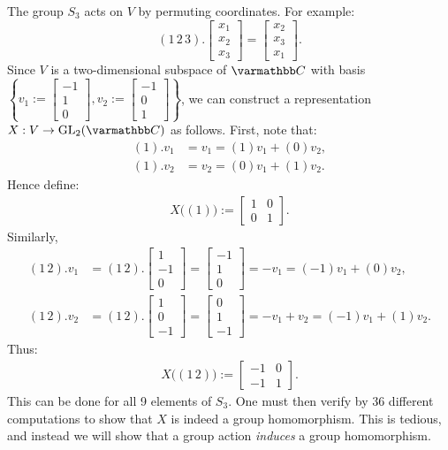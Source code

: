\begin{example}
	The group $S_3$ acts on $V$ by permuting coordinates. For example:
	\[
		(1\,2\,3).\begin{bmatrix} x_1 \\ x_2 \\ x_3 \end{bmatrix} = \begin{bmatrix} x_2 \\ x_3 \\x_1 \end{bmatrix}.
	\]
	Since $V$ is a two-dimensional subspace of $\bfC$ with basis $\left\{ v_1:= \begin{bmatrix} -1 \\ 1 \\ 0 \end{bmatrix}, v_2:= \begin{bmatrix} -1 \\ 0 \\ 1 \end{bmatrix}\right\} $, we can construct a representation $X:V \rightarrow \GL_2(\bfC)$ as follows. First, note that:
	\begin{align*}
		(1).v_1 &= v_1 = (1)v_1 + (0)v_2, \\
		(1).v_2 &= v_2 = (0)v_1 + (1)v_2.
	\end{align*}
	Hence define:
	\begin{align*}
		X\bigl( (1)\bigr) := \begin{bmatrix} 1 & 0 \\ 0 & 1 \end{bmatrix}.
	\end{align*}
	Similarly,
	\begin{align*}
		(1\,2).v_1 &= (1\,2). \begin{bmatrix} 1 \\ -1 \\ 0 \end{bmatrix} = \begin{bmatrix} -1 \\ 1 \\ 0 \end{bmatrix} = -v_1 = (-1)v_1 + (0)v_2, \\
		(1\,2).v_2 &= (1\,2). \begin{bmatrix} 1 \\ 0 \\ -1 \end{bmatrix} = \begin{bmatrix} 0 \\ 1 \\ -1 \end{bmatrix} = -v_1 + v_2 = (-1)v_1 + (1)v_2.
	\end{align*}
	Thus:
	\begin{align*}
		X\bigl((1\,2) \bigr) := \begin{bmatrix} -1 & 0 \\ -1 & 1 \end{bmatrix} .
	\end{align*}
	This can be done for all 9 elements of $S_3$. One must then verify by 36 different computations to show that $X$ is indeed a group homomorphism. This is tedious, and instead we will show that a group action \textit{induces} a group homomorphism.
\end{example}


